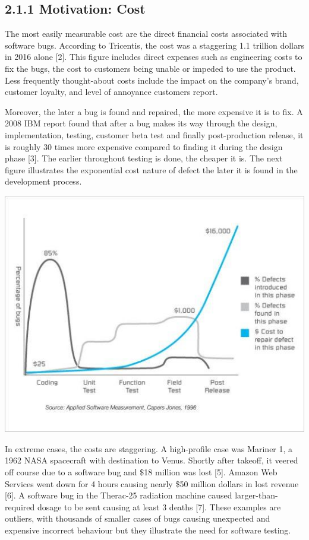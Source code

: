 \documentclass[12pt]{report}
\begin{document}
\subsection*{2.1.1 Motivation: Cost}
\par\indent
The most easily measurable cost are the direct financial costs associated with software bugs. According to Tricentis, the cost was a staggering 1.1 trillion dollars in 2016 alone [2]. This figure includes direct expenses such as engineering costs to fix the bugs, the cost to customers being unable or impeded to use the product. Less frequently thought-about costs include the impact on the company's brand, customer loyalty, and level of annoyance customers report.
\par\noindent
Moreover, the later a bug is found and repaired, the more expensive it is to fix. A 2008 IBM report found that after a bug makes its way through the design, implementation, testing, customer beta test and finally post-production release, it is roughly 30 times more expensive compared to finding it during the design phase [3]. The earlier throughout testing is done, the cheaper it is. The next figure illustrates the exponential cost nature of defect the later it is found in the development process. 

\begin{center}
\includegraphics[scale=0.7]{cost-test}
\end{center}
\par\noindent
In extreme cases, the costs are staggering. A high-profile case was Mariner 1, a 1962 NASA spacecraft with destination to Venus. Shortly after takeoff, it veered off course due to a software bug and \$18 million was lost [5]. Amazon Web Services went down for 4 hours causing nearly \$50 million dollars in lost revenue [6]. A software bug in the Therac-25 radiation machine caused larger-than-required dosage to be sent causing at least 3 deaths [7]. These examples are outliers, with thousands of smaller cases of bugs causing unexpected and expensive incorrect behaviour but they illustrate the need for software testing.
\end{document}
